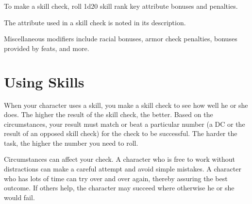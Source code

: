  To make a skill check, roll 1d20 \add skill rank \add key attribute \add bonuses and penalties.

 The attribute used in a skill check is noted in its description.

 Miscellaneous modifiers include racial bonuses, armor check penalties, bonuses provided by feats, and more.

\section{Using Skills}
When your character uses a skill, you make a skill check to see how well he or she does. The higher the result of the skill check, the better. Based on the circumstances, your result must match or beat a particular number (a DC or the result of an opposed skill check) for the check to be successful. The harder the task, the higher the number you need to roll.

Circumstances can affect your check. A character who is free to work without distractions can make a careful attempt and avoid simple mistakes. A character who has lots of time can try over and over again, thereby assuring the best outcome. If others help, the character may succeed where otherwise he or she would fail.

